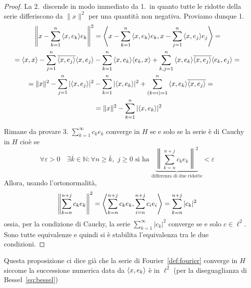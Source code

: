 \begin{proof}
    La 2.~discende in modo immediato da 1.~in quanto tutte le ridotte della
    serie differiscono da \(\|x\|^2\) per una quantità non negativa.
    Proviamo dunque 1.
    \begin{align*}
        \left\|x - \sum_{k=1}^{n} {\left\langle x, e_{k}\right\rangle} e_{k} \right\|^2 &= {\left\langle x -
          \sum_{k=1}^{n} {\left\langle x, e_{k}\right\rangle} e_{k}, x - \sum_{j=1}^{n} {\left\langle x,
    e_{j}\right\rangle} e_{j}\right\rangle} = \\ = {\left\langle x, x\right\rangle} - \sum_{j=1}^{n} \overline{{\left\langle x, e_{j}\right\rangle}
        }{\left\langle x, e_{j}\right\rangle} &- \sum_{k=1}^{n} {\left\langle x, e_{k}\right\rangle} {\left\langle e_{k}, x\right\rangle} +
\sum_{k,j=1}^{n} {\left\langle x, e_{k}\right\rangle} \overline{{\left\langle x, e_{j}\right\rangle}}{\left\langle e_{k}, e_{j}\right\rangle} =
\\
= \|x\|^2 - \sum_{j=1}^{n} |{\left\langle x, e_{j}\right\rangle} |^2 &- \sum_{k=1}^{n} |{\left\langle x,
e_{k}\right\rangle}|^2 + \sum_{(k=i)=1}^{n} {\left\langle x, e_{k}\right\rangle} \overline{{\left\langle x, e_{j}\right\rangle}} = \\ &=
\|x\|^2 - \sum_{k=1}^{n} |{\left\langle x, e_{k}\right\rangle} |^2
    \end{align*}

    Rimane da provare 3. 
    \(\sum_{k=1}^{\infty} c_{k} e_{k} \) converge in \(H\) se e solo se la serie
    è di Cauchy in \(H\) cioè se
    \[
      \forall \varepsilon > 0 \quad \exists \overline{k} \in \mathbb{N} :
      \forall n \ge \overline{k},\,\,j \ge 0 \text{ si ha } \underbrace{\left\|
      \sum_{k=n}^{n+j} c_{k} e_{k} \right\|^2}_{\text{differenza di due ridotte}}  < \varepsilon
    \]
    Allora, usando l'ortonormalità,
    \[
      \left\|\sum_{k=n}^{n+j} c_{k} e_{k} \right\|^2 = {\left\langle\sum_{k=n}^{n+j}
      c_{k} e_{k}, \sum_{i=n}^{n+j} c_{i} e_{i }\right\rangle} = \sum_{k=n}^{n+j} |c_{k}|^2
    \]
    ossia, per la condizione di Cauchy, la serie
    \(\sum_{k=1}^{\infty} |c_k|^2 \) converge se e solo
    \(c \in \ell^2\). Sono tutte equivalenze e quindi si è stabilita l'equivalenza tra le due condizioni. 
\end{proof}
\begin{remark}
    Questa proposizione ci dice già che la serie di Fourier~\ref{def:fourier}
    converge in \(H\) siccome la successione numerica data da \({\left\langle x,
    e_{k}\right\rangle}\) è in \(\ell^2\) (per la diseguaglianza di Bessel~\eqref{eq:bessel})
\end{remark}

